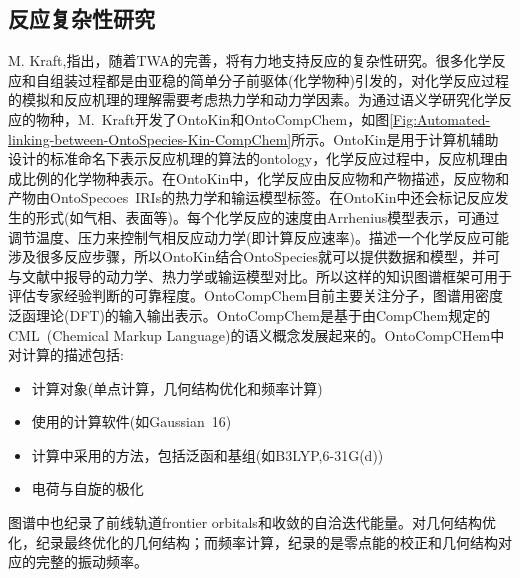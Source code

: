 \subsection{反应复杂性研究}
\textrm{M. Kraft,}指出，随着\textrm{TWA}的完善，将有力地支持反应的复杂性研究。很多化学反应和自组装过程都是由亚稳的简单分子前驱体(化学物种)引发的，对化学反应过程的模拟和反应机理的理解需要考虑热力学和动力学因素。为通过语义学研究化学反应的物种，\textrm{M.~Kraft}开发了\textrm{OntoKin}和\textrm{OntoCompChem}，如图\ref{Fig:Automated-linking-between-OntoSpecies-Kin-CompChem}所示。\textrm{OntoKin}是用于计算机辅助设计的标准命名下表示反应机理的算法的\textrm{ontology}，化学反应过程中，反应机理由成比例的化学物种表示。在\textrm{OntoKin}中，化学反应由反应物和产物描述，反应物和产物由\textrm{OntoSpecoes~IRIs}的热力学和输运模型标签。在\textrm{OntoKin}中还会标记反应发生的形式(如气相、表面等)。每个化学反应的速度由\textrm{Arrhenius}模型表示，可通过调节温度、压力来控制气相反应动力学(即计算反应速率)。描述一个化学反应可能涉及很多反应步骤，所以\textrm{OntoKin}结合\textrm{OntoSpecies}就可以提供数据和模型，并可与文献中报导的动力学、热力学或输运模型对比。所以这样的知识图谱框架可用于评估专家经验判断的可靠程度。\textrm{OntoCompChem}目前主要关注分子，图谱用密度泛函理论\textrm{(DFT)}的输入输出表示。\textrm{OntoCompChem}是基于由\textrm{CompChem}规定的\textrm{CML~(Chemical Markup Language)}的语义概念发展起来的。\textrm{OntoCompCHem}中对计算的描述包括:
\begin{itemize}
	\item 计算对象(单点计算，几何结构优化和频率计算)
	\item 使用的计算软件(如\textrm{Gaussian~16})
	\item 计算中采用的方法，包括泛函和基组(如\textrm{B3LYP,6-31G(d)})
	\item 电荷与自旋的极化
\end{itemize}
图谱中也纪录了前线轨道\textrm{frontier orbitals}和收敛的自洽迭代能量。对几何结构优化，纪录最终优化的几何结构；而频率计算，纪录的是零点能的校正和几何结构对应的完整的振动频率。

